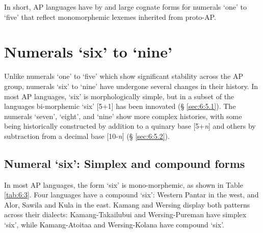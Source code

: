 In short, AP languages have by and large cognate forms for numerals `one' to `five' that reflect monomorphemic lexemes inherited from proto-AP. 

\section{Numerals `six' to `nine'}\label{sec:6:5}
Unlike numerals `one' to `five' which show significant stability across the AP group, numerals `six' to `nine' have undergone several changes in their history. In most AP languages, `six' is morphologically simple, but in a subset of the languages bi-morphemic `six' [5+1] has been innovated ({\S} \ref{sec:6:5.1}). The numerals `seven', `eight', and `nine' show more complex histories, with some being historically constructed by addition to a quinary base [5+\textit{n}] and others by subtraction from a decimal base [10-\textit{n}] ({\S} \ref{sec:6:5.2}). 

\subsection{Numeral `six': Simplex and compound forms} 
In most AP languages, the form `six' is mono-morphemic, as shown in Table \ref{tab:6:3}. Four languages have a compound `six': Western Pantar in the west, and Alor, Sawila and Kula in the east. Kamang and Wersing display both patterns across their dialects: Kamang-Takailubui and Wersing-Pureman have simplex `six', while Kamang-Atoitaa and Wersing-Kolana have compound `six'. 

 


